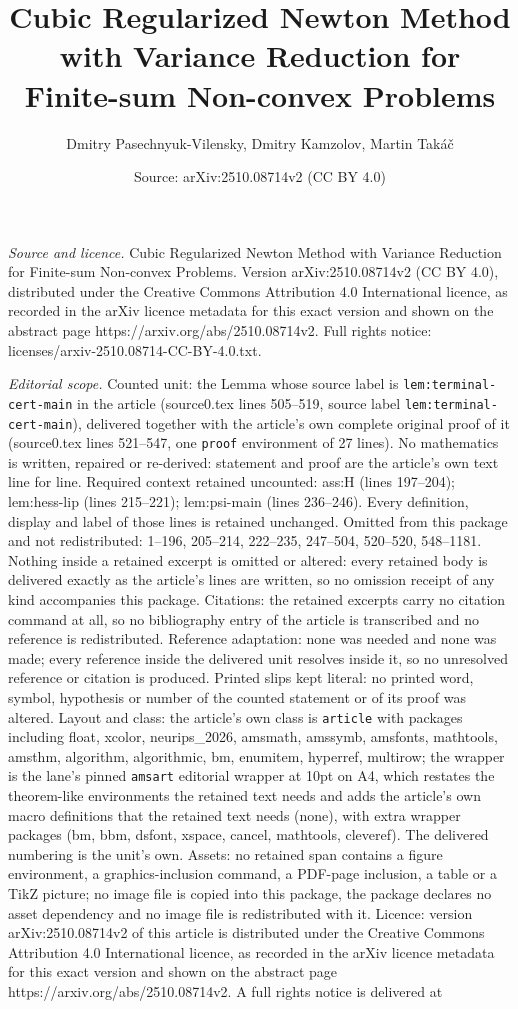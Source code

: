 \documentclass[10pt,a4paper]{amsart}
\title[Cubic Regularized Newton Method with Variance Reduction for ]{Cubic Regularized Newton Method with Variance Reduction for Finite-sum Non-convex Problems}
\author{Dmitry Pasechnyuk-Vilensky, Dmitry Kamzolov, Martin Tak\'a\v{c}}
\date{Source: arXiv:2510.08714v2 (CC BY 4.0)}
\begin{document}
\maketitle

\noindent\emph{Source and licence.} Cubic Regularized Newton Method with Variance Reduction for Finite-sum Non-convex Problems. Version arXiv:2510.08714v2 (CC BY 4.0), distributed under the Creative Commons Attribution 4.0 International licence, as recorded in the arXiv licence metadata for this exact version and shown on the abstract page https://arxiv.org/abs/2510.08714v2. Full rights notice: licenses/arxiv-2510.08714-CC-BY-4.0.txt.\par\smallskip

\noindent\textit{Editorial scope.} Counted unit: the Lemma whose source label is \texttt{lem:terminal-cert-main} in the article (source0.tex lines 505--519, source label \texttt{lem:terminal-cert-main}), delivered together with the article's own complete original proof of it (source0.tex lines 521--547, one \texttt{proof} environment of 27 lines). No mathematics is written, repaired or re-derived: statement and proof are the article's own text line for line. Required context retained uncounted: ass:H (lines 197--204); lem:hess-lip (lines 215--221); lem:psi-main (lines 236--246). Every definition, display and label of those lines is retained unchanged. Omitted from this package and not redistributed: 1--196, 205--214, 222--235, 247--504, 520--520, 548--1181. Nothing inside a retained excerpt is omitted or altered: every retained body is delivered exactly as the article's lines are written, so no omission receipt of any kind accompanies this package. Citations: the retained excerpts carry no citation command at all, so no bibliography entry of the article is transcribed and no reference is redistributed. Reference adaptation: none was needed and none was made; every reference inside the delivered unit resolves inside it, so no unresolved reference or citation is produced. Printed slips kept literal: no printed word, symbol, hypothesis or number of the counted statement or of its proof was altered. Layout and class: the article's own class is \texttt{article} with packages including float, xcolor, neurips\_2026, amsmath, amssymb, amsfonts, mathtools, amsthm, algorithm, algorithmic, bm, enumitem, hyperref, multirow; the wrapper is the lane's pinned \texttt{amsart} editorial wrapper at 10pt on A4, which restates the theorem-like environments the retained text needs and adds the article's own macro definitions that the retained text needs (none), with extra wrapper packages (bm, bbm, dsfont, xspace, cancel, mathtools, cleveref). The delivered numbering is the unit's own. Assets: no retained span contains a figure environment, a graphics-inclusion command, a PDF-page inclusion, a table or a TikZ picture; no image file is copied into this package, the package declares no asset dependency and no image file is redistributed with it. Licence: version arXiv:2510.08714v2 of this article is distributed under the Creative Commons Attribution 4.0 International licence, as recorded in the arXiv licence metadata for this exact version and shown on the abstract page https://arxiv.org/abs/2510.08714v2. A full rights notice is delivered at 
\end{document}
